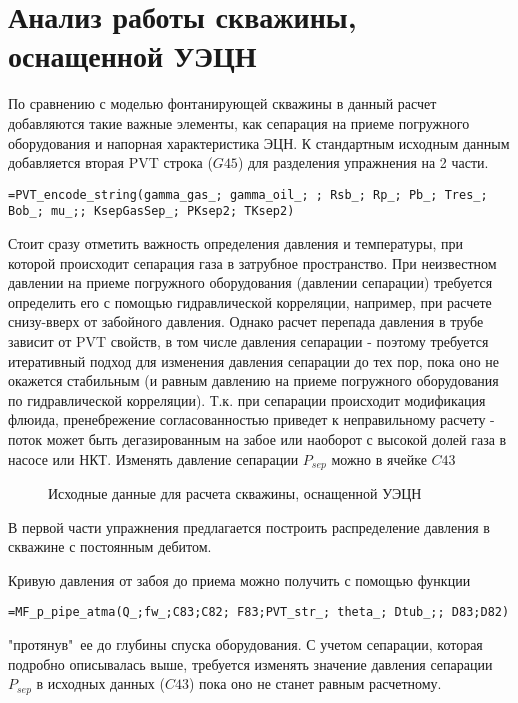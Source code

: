 \section{Анализ работы скважины, оснащенной УЭЦН}

По сравнению с моделью фонтанирующей скважины в данный расчет добавляются такие важные элементы, как сепарация на приеме погружного оборудования и напорная характеристика ЭЦН. К стандартным исходным данным добавляется вторая PVT строка ($G45$) для разделения упражнения на 2 части. 

{ \small  \texttt{=PVT\_encode\_string(gamma\_gas\_; gamma\_oil\_; ; Rsb\_; Rp\_; Pb\_; Tres\_; Bob\_; mu\_;; KsepGasSep\_; PKsep2; TKsep2)
}}

Стоит сразу отметить важность определения давления и температуры, при которой происходит сепарация газа в затрубное пространство. При неизвестном давлении на приеме погружного оборудования (давлении сепарации) требуется определить его с помощью гидравлической корреляции, например, при расчете снизу-вверх от забойного давления. Однако расчет перепада давления в трубе зависит от PVT свойств, в том числе давления сепарации - поэтому требуется итеративный подход для изменения давления сепарации до тех пор, пока оно не окажется стабильным (и равным давлению на приеме погружного оборудования по гидравлической корреляции). Т.к. при сепарации происходит модификация флюида, пренебрежение согласованностью приведет к неправильному расчету - поток может быть дегазированным на забое или наоборот с высокой долей газа в насосе или НКТ. Изменять давление сепарации $P_{sep}$ можно в ячейке $C43$

\begin{figure}[h!]
	\center{\texttt{[image: Ex100\_1]}}
	\caption{Исходные данные для расчета скважины, оснащенной УЭЦН}
	\label{ris:Ex100_1}
\end{figure}

В первой части упражнения предлагается построить распределение давления в скважине с постоянным дебитом. 

Кривую давления от забоя до приема можно получить с помощью функции

{ \small  \texttt{=MF\_p\_pipe\_atma(Q\_;fw\_;C83;C82; F83;PVT\_str\_; theta\_; Dtub\_;; D83;D82)
}}

"протянув"\ ее до глубины спуска оборудования. С учетом сепарации, которая подробно описывалась выше, требуется изменять значение давления сепарации $P_{sep}$ в исходных данных ($C43$) пока оно не станет равным расчетному.

